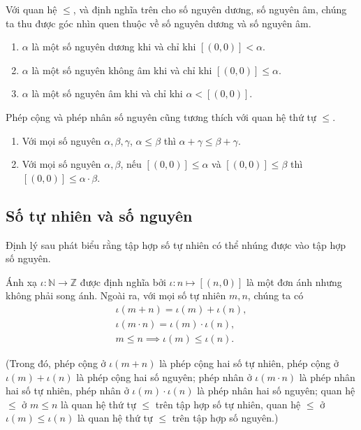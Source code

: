 Với quan hệ $\leq$, và định nghĩa trên cho số nguyên dương, số nguyên âm, chúng ta thu được góc nhìn quen thuộc về số nguyên dương và số nguyên âm.
\begin{enumerate}[label={(\roman*)}]
    \item $\alpha$ là một số nguyên dương khi và chỉ khi $[(0,0)] < \alpha$.
    \item $\alpha$ là một số nguyên không âm khi và chỉ khi $[(0,0)] \leq \alpha$.
    \item $\alpha$ là một số nguyên âm khi và chỉ khi $\alpha < [(0,0)]$.
\end{enumerate}

Phép cộng và phép nhân số nguyên cũng tương thích với quan hệ thứ tự $\leq$.
\begin{theorem}\label{theorem:integers-order-and-operations}
    \begin{enumerate}[label={(\roman*)}]
        \item Với mọi số nguyên $\alpha, \beta, \gamma$, $\alpha\leq \beta$ thì $\alpha + \gamma\leq \beta + \gamma$.
        \item Với mọi số nguyên $\alpha, \beta$, nếu $[(0,0)]\leq\alpha$ và $[(0,0)]\leq\beta$ thì $[(0,0)]\leq\alpha\cdot\beta$.
    \end{enumerate}
\end{theorem}

\subsection{Số tự nhiên và số nguyên}

Định lý sau phát biểu rằng tập hợp số tự nhiên có thể nhúng được vào tập hợp số nguyên.
\begin{theorem}\label{theorem:embed-N-into-Z}
    Ánh xạ $\iota: \mathbb{N}\to \mathbb{Z}$ được định nghĩa bởi $\iota: n\mapsto [(n, 0)]$ là một đơn ánh nhưng không phải song ánh. Ngoài ra, với mọi số tự nhiên $m, n$, chúng ta có
    \[
        \begin{split}
            \iota(m + n) = \iota(m) + \iota(n), \\
            \iota(m\cdot n) = \iota(m)\cdot\iota(n), \\
            m\leq n \implies \iota(m)\leq \iota(n).
        \end{split}
    \]

    (Trong đó, phép cộng ở $\iota(m + n)$ là phép cộng hai số tự nhiên, phép cộng ở $\iota(m) + \iota(n)$ là phép cộng hai số nguyên; phép nhân ở $\iota(m\cdot n)$ là phép nhân hai số tự nhiên, phép nhân ở $\iota(m)\cdot\iota(n)$ là phép nhân hai số nguyên; quan hệ $\leq$ ở $m\leq n$ là quan hệ thứ tự $\leq$ trên tập hợp số tự nhiên, quan hệ $\leq$ ở $\iota(m)\leq \iota(n)$ là quan hệ thứ tự $\leq$ trên tập hợp số nguyên.)
\end{theorem}

